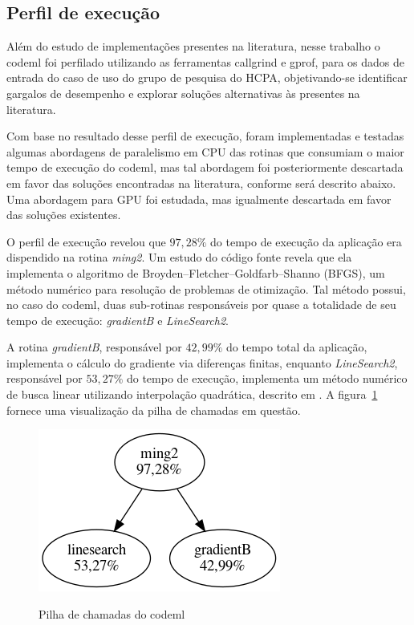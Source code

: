 \documentclass[cic,tc]{iiufrgs}
\begin{document}
\subsection{Perfil de execução}
\label{subsec:codemlpar}

Além do estudo de implementações presentes na literatura, nesse trabalho o
codeml foi perfilado utilizando as ferramentas callgrind e gprof, para os dados
de entrada do caso de uso do grupo de pesquisa do HCPA, objetivando-se
identificar gargalos de desempenho e explorar soluções alternativas às
presentes na literatura.

Com base no resultado desse perfil de execução, foram implementadas e testadas
algumas abordagens de paralelismo em CPU das rotinas que consumiam o maior
tempo de execução do codeml, mas tal abordagem foi posteriormente descartada em
favor das soluções encontradas na literatura, conforme será descrito abaixo.
Uma abordagem para GPU foi estudada, mas igualmente descartada em favor das
soluções existentes.

O perfil de execução revelou que $97,28\%$ do tempo de execução da aplicação
era dispendido na rotina \textit{ming2}. Um estudo do código fonte revela que
ela implementa o algoritmo de Broyden–Fletcher–Goldfarb–Shanno (BFGS), um
método numérico para resolução de problemas de otimização. Tal método possui,
no caso do codeml, duas sub-rotinas responsáveis por quase a totalidade de seu
tempo de execução: \textit{gradientB} e \textit{LineSearch2}.

A rotina \textit{gradientB}, responsável por $42,99\%$ do tempo total da
aplicação, implementa o cálculo do gradiente via diferenças finitas, enquanto
\textit{LineSearch2}, responsável por $53,27\%$ do tempo de execução,
implementa um método numérico de busca linear utilizando interpolação
quadrática, descrito em \cite{wolfe1978numerical}. A
figura~\ref{fig:kcachegrind} fornece uma visualização da pilha de chamadas em
questão.

\begin{figure} \caption{Pilha de chamadas do codeml} \begin{center}
\includegraphics[width=0.3\linewidth]{img/kcachegrind.png} \end{center}
 \label{fig:kcachegrind} \end{figure}
\end{document}
